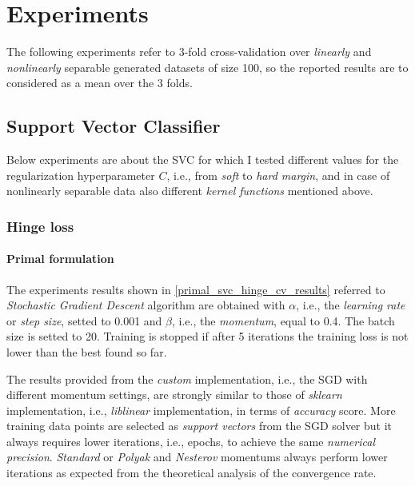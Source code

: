 \section{Experiments}

The following experiments refer to 3-fold cross-validation over \emph{linearly} and \emph{nonlinearly} separable generated datasets of size 100, so the reported results are to considered as a mean over the 3 folds.

\subsection{Support Vector Classifier}

Below experiments are about the SVC for which I tested different values for the regularization hyperparameter $C$, i.e., from \emph{soft} to \emph{hard margin}, and in case of nonlinearly separable data also different \emph{kernel functions} mentioned above.

\subsubsection{Hinge loss}

\paragraph{Primal formulation}

The experiments results shown in \ref{primal_svc_hinge_cv_results} referred to \emph{Stochastic Gradient Descent} algorithm are obtained with $\alpha$, i.e., the \emph{learning rate} or \emph{step size}, setted to 0.001 and $\beta$, i.e., the \emph{momentum}, equal to 0.4. The batch size is setted to 20. Training is stopped if after 5 iterations the training loss is not lower than the best found so far.



The results provided from the \emph{custom} implementation, i.e., the SGD with different momentum settings, are strongly similar to those of \emph{sklearn} implementation, i.e., \emph{liblinear} \cite{fan2008liblinear} implementation, in terms of \emph{accuracy} score. More training data points are selected as \emph{support vectors} from the SGD solver but it always requires lower iterations, i.e., epochs, to achieve the same \emph{numerical precision}. \emph{Standard} or \emph{Polyak} and \emph{Nesterov} momentums always perform lower iterations as expected from the theoretical analysis of the convergence rate.

